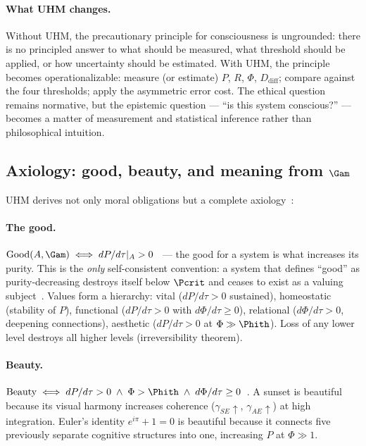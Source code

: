 \paragraph{What UHM changes.}
Without UHM, the precautionary principle for consciousness is ungrounded:
there is no principled answer to what should be measured, what threshold
should be applied, or how uncertainty should be estimated. With UHM, the
principle becomes operationalizable: measure (or estimate) $P$, $R$,
$\Phi$, $D_{\mathrm{diff}}$; compare against the four thresholds; apply the
asymmetric error cost. The ethical question remains normative, but the
epistemic question --- ``is this system conscious?'' --- becomes a matter
of measurement and statistical inference rather than philosophical
intuition.

\subsection{Axiology: good, beauty, and meaning from $\Gam$}
\label{subsec:axiology}

UHM derives not only moral obligations but a complete axiology~:

\paragraph{The good.}
$\mathrm{Good}(A, \Gam) \iff dP/d\tau|_A > 0$~ --- the good for a system is
what increases its purity. This is the \emph{only} self-consistent convention: a system
that defines ``good'' as purity-decreasing destroys itself below $\Pcrit$ and ceases to
exist as a valuing subject~. Values form a hierarchy: vital ($dP/d\tau > 0$
sustained), homeostatic (stability of $P$), functional ($dP/d\tau > 0$ with
$d\Phi/d\tau \geq 0$), relational ($d\Phi/d\tau > 0$, deepening connections), aesthetic
($dP/d\tau > 0$ at $\Phi \gg \Phith$). Loss of any lower level destroys all higher
levels (irreversibility theorem).

\paragraph{Beauty.}
$\mathrm{Beauty} \iff dP/d\tau > 0 \;\wedge\; \Phi > \Phith \;\wedge\;
d\Phi/d\tau \geq 0$~. A sunset is beautiful because its visual harmony
increases coherence ($\gamma_{SE} \uparrow$, $\gamma_{AE} \uparrow$) at high integration.
Euler's identity $e^{i\pi} + 1 = 0$ is beautiful because it connects five previously
separate cognitive structures into one, increasing $P$ at $\Phi \gg 1$.

